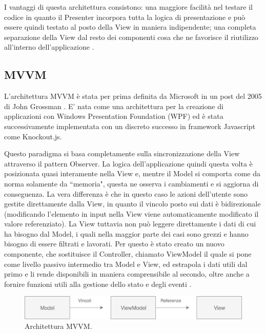 \noindent
I vantaggi di questa architettura consistono: una maggiore facilità nel testare il codice in quanto il Presenter incorpora tutta la logica di presentazione e può essere quindi testato al posto della View in maniera indipendente; una completa separazione della View dal resto dei componenti cosa che ne favorisce il riutilizzo all'interno dell'applicazione \cite{OsmaniOnJSFrameworks}.

\subsection{MVVM}
L'architettura MVVM è stata per prima definita da Microsoft in un post del 2005 di John Grossman \cite{GossmanOnMVVM}. E' nata come una architettura per la creazione di applicazioni con Windows Presentation Foundation (WPF) ed è stata successivamente implementata con un discreto successo in framework Javascript come Knockout.js.

Questo paradigma si basa completamente sulla sincronizzazione della View attraverso il pattern Observer. La logica dell'applicazione quindi questa volta è posizionata quasi interamente nella View e, mentre il Model si comporta come da norma solamente da “memoria", questa ne osserva i cambiamenti e si aggiorna di conseguenza. La vera differenza è che in questo caso le azioni dell'utente sono gestite direttamente dalla View, in quanto il vincolo posto sui dati è bidirezionale (modificando l'elemento in input nella View viene automaticamente modificato il valore referenziato).
La View tuttavia non può leggere direttamente i dati di cui ha bisogno dal Model, i quali nella maggior parte dei casi sono grezzi e hanno bisogno di essere filtrati e lavorati. Per questo è stato creato un nuovo componente, che sostituisce il Controller, chiamato ViewModel il quale si pone come livello passivo intermedio tra Model e View, ed estrapola i dati utili dal primo e li rende disponibili in maniera comprensibile al secondo, oltre anche a fornire funzioni utili alla gestione dello stato e degli eventi \cite{OsmaniOnJSFrameworks}.

\begin{figure}[h]
\centering 
\vspace*{0.5cm}
\includegraphics[width=13cm]{./images/MVVMworkflow}
\caption{Architettura MVVM.}
\vspace*{0.5cm} 
\end{figure}

